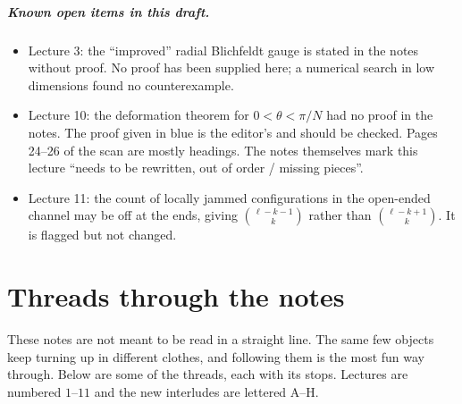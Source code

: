 \documentclass[11pt,openany]{book}
\theoremstyle{plain}
\theoremstyle{definition}
\theoremstyle{remark}
\begin{document}
\paragraph{Known open items in this draft.}
\begin{itemize}
\item Lecture 3: the ``improved'' radial Blichfeldt gauge is stated in the notes without proof. No proof
  has been supplied here; a numerical search in low dimensions found no counterexample.
\item Lecture 10: the deformation theorem for $0<\theta<\pi/N$ had no proof in the notes. The proof given
  in blue is the editor's and should be checked. Pages 24--26 of the scan are mostly headings.
  The notes themselves mark this lecture ``needs to be rewritten, out of order / missing pieces''.
\item Lecture 11: the count of locally jammed configurations in the open-ended channel may be off at the
  ends, giving $\binom{\ell-k-1}{k}$ rather than $\binom{\ell-k+1}{k}$. It is flagged but not changed.
\end{itemize}

\tableofcontents

\chapter*{Threads through the notes}
\label{THR:ch}

These notes are not meant to be read in a straight line. The same few objects keep turning up in
different clothes, and following them is the most fun way through. Below are some of the threads,
each with its stops. Lectures are numbered $1$--$11$ and the new interludes are lettered A--H.
\end{document}
